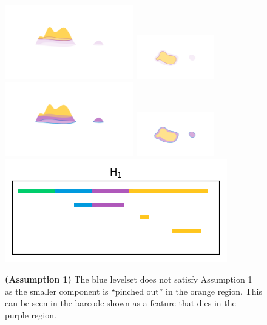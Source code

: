 \begin{figure}[htbp]
  \centering
  \includegraphics[trim=200 300 200 200, clip, width=0.5\textwidth]{scripts/figures/surf/ass1_D_side.png}
  \includegraphics[trim=300 150 200 200, clip, width=0.3\textwidth]{scripts/figures/surf/ass1_D_top.png}
  \includegraphics[trim=200 300 200 200, clip, width=0.5\textwidth]{scripts/figures/surf/ass1_C_side.png}
  \includegraphics[trim=300 150 200 200, clip, width=0.3\textwidth]{scripts/figures/surf/ass1_C_top.png}
  \includegraphics[scale=0.7]{scripts/figures/scalar_barcode_H1.png}
  \caption{\textbf{(Assumption 1)} The blue levelset does not satisfy Assumption 1 as the smaller component is ``pinched out'' in the orange region.
            This can be seen in the barcode shown as a feature that dies in the purple region.}
\end{figure}


